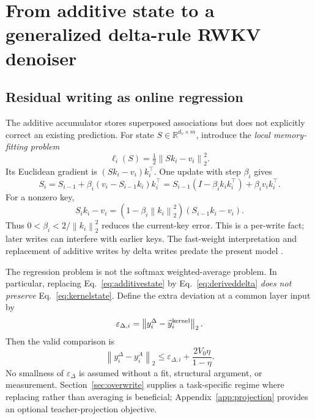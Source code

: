 \documentclass{article}
\theoremstyle{remark}\newtheorem{remark}[theorem]{Remark}
\newcommand{\R}{\mathbb R}
\newcommand{\norm}[1]{\left\lVert #1\right\rVert}
\begin{document}
\section{From additive state to a generalized delta-rule RWKV denoiser}
\label{sec:stateconstruction}
\subsection{Residual writing as online regression}
The additive accumulator stores superposed associations but does not explicitly correct an existing prediction. For state $S\in\R^{d_v\times m}$, introduce the \emph{local memory-fitting problem}
\begin{equation}
 \ell_i(S)=\tfrac12\norm{Sk_i-v_i}_2^2.
\end{equation}
Its Euclidean gradient is $(Sk_i-v_i)k_i^\top$. One update with step $\beta_i$ gives
\begin{equation}
 S_i=S_{i-1}+\beta_i(v_i-S_{i-1}k_i)k_i^\top
 =S_{i-1}(I-\beta_i k_ik_i^\top)+\beta_i v_ik_i^\top.
 \label{eq:deriveddelta}
\end{equation}
For a nonzero key,
\begin{equation}
 S_ik_i-v_i=(1-\beta_i\norm{k_i}_2^2)(S_{i-1}k_i-v_i).
\end{equation}
Thus $0<\beta_i<2/\norm{k_i}_2^2$ reduces the current-key error. This is a per-write fact; later writes can interfere with earlier keys. The fast-weight interpretation and replacement of additive writes by delta writes predate the present model \cite{fastweights,deltanet}.

The regression problem is not the softmax weighted-average problem. In particular, replacing Eq.~\eqref{eq:additivestate} by Eq.~\eqref{eq:deriveddelta} \emph{does not preserve} Eq.~\eqref{eq:kernelstate}. Define the extra deviation at a common layer input by
\begin{equation}
 \varepsilon_{\Delta,i}=\norm{y_i^{\Delta}-\widehat y_i^{\rm kernel}}_2.
\end{equation}
Then the valid comparison is
\begin{equation}
 \norm{y_i^{\Delta}-y_i^A}_2
 \le\varepsilon_{\Delta,i}+\frac{2V_0\eta}{1-\eta}.
 \label{eq:deltaapproxsplit}
\end{equation}
No smallness of $\varepsilon_\Delta$ is assumed without a fit, structural argument, or measurement. Section~\ref{sec:overwrite} supplies a task-specific regime where replacing rather than averaging is beneficial; Appendix~\ref{app:projection} provides an optional teacher-projection objective.
\end{document}
